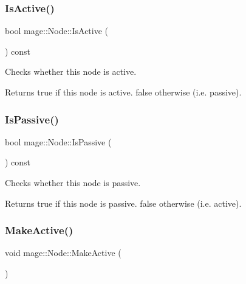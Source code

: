 \subsubsection{\texorpdfstring{Is\+Active()}{IsActive()}}
{\footnotesize\ttfamily bool mage\+::\+Node\+::\+Is\+Active (\begin{DoxyParamCaption}{ }\end{DoxyParamCaption}) const\hspace{0.3cm}{\ttfamily [noexcept]}}

Checks whether this node is active.

\begin{DoxyReturn}{Returns}
{\ttfamily true} if this node is active. {\ttfamily false} otherwise (i.\+e. passive). 
\end{DoxyReturn}
\hypertarget{classmage_1_1_node_a5fb6ac39c7e0d630944594cd5426f61a}{}\label{classmage_1_1_node_a5fb6ac39c7e0d630944594cd5426f61a} 
\subsubsection{\texorpdfstring{Is\+Passive()}{IsPassive()}}
{\footnotesize\ttfamily bool mage\+::\+Node\+::\+Is\+Passive (\begin{DoxyParamCaption}{ }\end{DoxyParamCaption}) const\hspace{0.3cm}{\ttfamily [noexcept]}}

Checks whether this node is passive.

\begin{DoxyReturn}{Returns}
{\ttfamily true} if this node is passive. {\ttfamily false} otherwise (i.\+e. active). 
\end{DoxyReturn}
\hypertarget{classmage_1_1_node_a3945ebd27cbb587d3fd0140df55eb4fb}{}\label{classmage_1_1_node_a3945ebd27cbb587d3fd0140df55eb4fb} 
\subsubsection{\texorpdfstring{Make\+Active()}{MakeActive()}}
{\footnotesize\ttfamily void mage\+::\+Node\+::\+Make\+Active (\begin{DoxyParamCaption}{ }\end{DoxyParamCaption})\hspace{0.3cm}{\ttfamily [noexcept]}}


